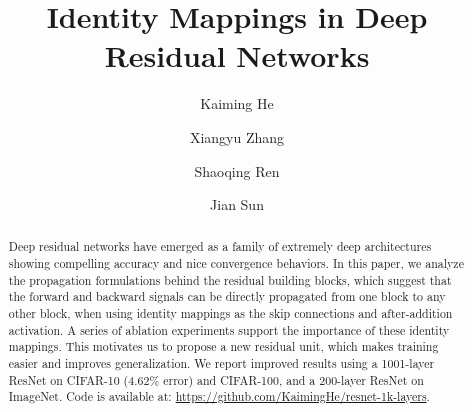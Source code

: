 \documentclass[runningheads]{llncs}
\begin{document}
\pagestyle{headings}
\mainmatter

\title{Identity Mappings in Deep Residual Networks}

\titlerunning{~}

\authorrunning{~}

\author{Kaiming He \and Xiangyu Zhang \and Shaoqing Ren \and Jian Sun}


\maketitle

\begin{abstract}
Deep residual networks \cite{He2016} have emerged as a family of extremely deep architectures showing compelling accuracy and nice convergence behaviors. In this paper, we analyze the propagation formulations behind the residual building blocks, which suggest that the forward and backward signals can be directly propagated from one block to any other block, when using identity mappings as the skip connections and after-addition activation. A series of ablation experiments support the importance of these identity mappings. This motivates us to propose a new residual unit, which makes training easier and improves generalization. We report improved results using a 1001-layer ResNet on CIFAR-10 (4.62\% error) and CIFAR-100,  and a 200-layer ResNet on ImageNet. Code is available at: \url{https://github.com/KaimingHe/resnet-1k-layers}.
\end{abstract}


\hypersetup{urlcolor=black}
\end{document}
